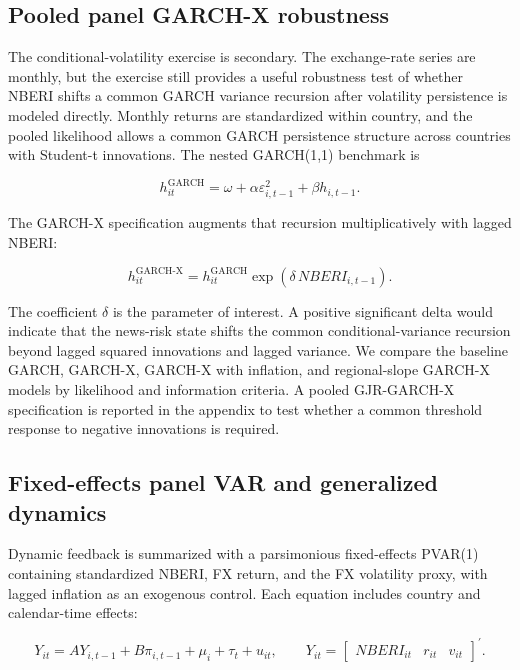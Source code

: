 \documentclass[11pt]{article}
\begin{document}
\subsection{Pooled panel GARCH-X
robustness}\label{pooled-panel-garch-x-robustness}

The conditional-volatility exercise is secondary. The exchange-rate
series are monthly, but the exercise still provides a useful
robustness test of whether NBERI shifts a common GARCH variance
recursion after volatility persistence is modeled directly. Monthly
returns are standardized within country, and the pooled likelihood
allows a common GARCH persistence structure across countries with
Student-t innovations. The nested GARCH(1,1) benchmark is

\begin{equation}
\label{eq:pooled-garch}
h_{it}^{\mathrm{GARCH}}
=\omega+\alpha\varepsilon_{i,t-1}^{2}+\beta h_{i,t-1}.
\end{equation}

The GARCH-X specification augments that recursion multiplicatively with lagged NBERI:

\begin{equation}
\label{eq:pooled-garchx}
h_{it}^{\mathrm{GARCH\text{-}X}}
=h_{it}^{\mathrm{GARCH}}
\exp\!\left(\delta\,NBERI_{i,t-1}\right).
\end{equation}

The coefficient $\delta$ is the parameter of interest. A positive
significant delta would indicate that the news-risk state shifts the
common conditional-variance recursion beyond lagged squared innovations
and lagged variance. We compare the baseline GARCH, GARCH-X, GARCH-X with
inflation, and regional-slope GARCH-X models by likelihood and
information criteria. A pooled GJR-GARCH-X specification is reported in
the appendix to test whether a common threshold response to negative
innovations is required.

\subsection{Fixed-effects panel VAR and generalized
dynamics}\label{fixed-effects-panel-var-and-generalized-dynamics}

Dynamic feedback is summarized with a parsimonious fixed-effects PVAR(1)
containing standardized NBERI, FX return, and the FX volatility proxy,
with lagged inflation as an exogenous control. Each equation includes
country and calendar-time effects:

\begin{equation}
\label{eq:pvar}
Y_{it}=A Y_{i,t-1}+B\pi_{i,t-1}+\mu_i+\tau_t+u_{it},
\qquad
Y_{it}=\begin{bmatrix}NBERI_{it}&r_{it}&v_{it}\end{bmatrix}^{\prime}.
\end{equation}
\end{document}
